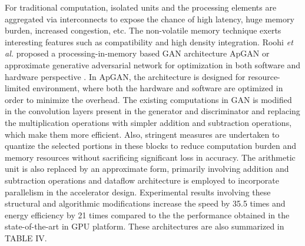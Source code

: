 \documentclass[journal]{IEEEtran}
\begin{document}
\par For traditional computation, isolated units and the processing elements are aggregated via interconnects to expose the chance of high latency, huge memory burden, increased congestion, etc. The non-volatile memory technique exerts interesting features such as compatibility and high density integration. Roohi \textit{et al.} proposed a processing-in-memory based GAN architecture ApGAN or approximate generative adversarial network for optimization in both software and hardware perspective \cite{paper42}. In ApGAN, the architecture is designed for resource-limited environment, where both the hardware and software are optimized in order to minimize the overhead. The existing computations in GAN is modified in the convolution layers present in the generator and discriminator and replacing the multiplication operations with simpler addition and subtraction operations, which make them more efficient. Also, stringent measures are undertaken to quantize the selected portions in these blocks to reduce computation burden and memory resources without sacrificing significant loss in accuracy. The arithmetic unit is also replaced by an approximate form, primarily involving addition and subtraction operations and dataflow architecture is employed to incorporate parallelism in the accelerator design. Experimental results involving these structural and algorithmic modifications increase the speed by 35.5 times and energy efficiency by 21 times compared to the the performance obtained in the state-of-the-art in GPU platform. These architectures are also summarized in TABLE IV.
\end{document}
